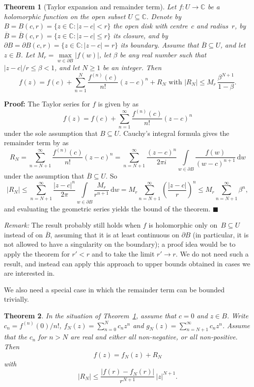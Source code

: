 \documentclass [11pt]{article}
\newcommand {\C}{\mathbb C}
\renewcommand {\leq}{\leqslant}
\renewcommand {\geq}{\geqslant}
\newcommand {\diff}{\mathrm {d}}
\newtheorem{theorem}{Theorem}
\newenvironment{proof}{\noindent \textbf {Proof:}}{{\hspace* {\fill}$\blacksquare$}}
\newenvironment{remark}{\noindent \textit {Remark:}}{}
\begin{document}
\begin {theorem}[Taylor expansion and remainder term]
\label {th:taylor}
Let $f : U \to \C$ be a holomorphic function on the open subset
$U \subseteq \C$. Denote by $B = B (c, r) = \{ z \in \C : |z - c| < r \}$
the open disk with centre~$c$ and radius~$r$, by
$\overline B = \overline B (c, r) = \{ z \in \C : |z - c| \leq r \}$
its closure, and by
$\partial B = \partial B (c, r) = \{ z \in \C : |z - c| = r \}$
its boundary. Assume that $\overline B \subseteq U$, and let $z \in B$.
Let $M_r = \max\limits_{w \in \partial B} |f (w)|$,
let $\beta$ be any real number such that $|z - c| / r \leq \beta < 1$,
and let $N \geq 1$ be an integer. Then
\[
f (z) = f (c) + \sum_{n = 1}^N \frac {f^{(n)} (c)}{n!} (z - c)^n + R_N
\text { with }
|R_N| \leq M_r \, \frac {\beta^{N + 1}}{1 - \beta}.
\]
\end {theorem}
\begin {proof}
The Taylor series for $f$ is given by \cite [Theorem~16-8]{Apostol57} as
\[
f (z) = f (c) + \sum_{n = 1}^\infty \frac {f^{(n)} (c)}{n!} (z - c)^n
\]
under the sole assumption that $B \subseteq U$.
Cauchy's integral formula gives the remainder term by
\cite [Theorem~16-7]{Apostol57} as
\[
R_N = \sum_{n = N+1}^\infty \frac {f^{(n)} (c)}{n!} (z - c)^n
= \sum_{n = N+1}^\infty \frac {(z - c)^n}{2 \pi i}
\int\limits_{w \in \partial B} \frac {f (w)}{(w - c)^{n+1}} \, \diff w
\]
under the assumption that $\overline B \subseteq U$.
So
\[
|R_N| \leq \sum_{n = N+1}^\infty \frac {|z - c|^n}{2 \pi}
\int\limits_{w \in \partial B} \frac {M_r}{r^{n+1}} \, \diff w
= M_r \sum_{n = N+1}^\infty \left( \frac {|z - c|}{r} \right)^n
\leq M_r \sum_{n = N+1}^\infty \beta^n,
\]
and evaluating the geometric series yields the bound of the theorem.
\end {proof}

\begin {remark}
The result probably still holds when $f$ is holomorphic only
on~$B \subseteq U$ instead of on $\overline B$, assuming that it is at
least continuous on $\partial B$ (in particular, it is not allowed to have
a singularity on the boundary); a proof idea would be to apply the theorem
for $r' < r$ and to take the limit $r' \to r$.
We do not need such a result, and instead can apply this approach to upper
bounds obtained in cases we are interested in.
\end {remark}

We also need a special case in which the remainder term can be bounded
trivially.

\begin {theorem}
\label {th:taylorpositive}
In the situation of Theorem~\ref {th:taylor}, assume that $c = 0$ and
$z \in B$. Write
$c_n = f^{(n)} (0) / n!$,
$f_N (z) = \sum_{n=0}^N c_n z^n$ and
$g_N (z) = \sum_{n = N+1}^\infty c_n z^n$.
Assume that the $c_n$ for $n > N$ are real and either all non-negative,
or all non-positive. Then
\[
f (z) = f_N (z) + R_N
\]
with
\[
|R_N| \leq \frac {|f (r) - f_N (r)|}{r^{N+1}} \, |z|^{N+1}.
\]
\end {theorem}
\end{document}
